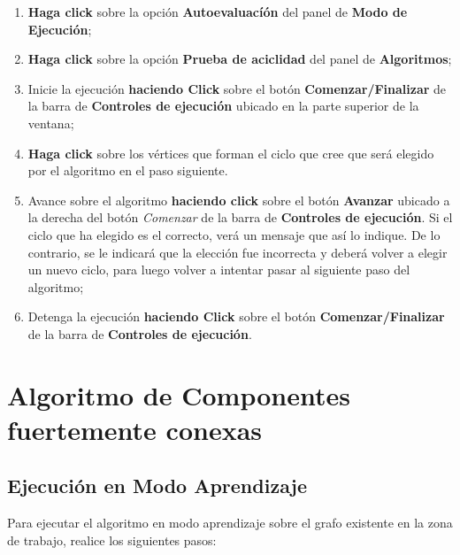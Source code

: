 \documentclass{book}
\begin{document}
\begin{enumerate}
	\itemsep=8pt \topsep=0pt \partopsep=0pt \parskip=0pt \parsep=0pt

	\item \textbf{Haga click} sobre la opción \textbf{Autoevaluacíón} del panel de \textbf{Modo de Ejecución};

	\item \textbf{Haga click} sobre la opción \textbf{Prueba de aciclidad} del panel de \textbf{Algoritmos};

	\item Inicie la ejecución \textbf{haciendo Click} sobre el botón \textbf{Comenzar/Finalizar} de la barra de \textbf{Controles de ejecución} ubicado en la parte superior de la ventana;

	\item \textbf{Haga click} sobre los vértices que forman el ciclo que cree que será elegido por el algoritmo en el paso siguiente.

	\item Avance sobre el algoritmo \textbf{haciendo click} sobre el botón \textbf{Avanzar} ubicado a la derecha del botón \textit{Comenzar} de la barra de \textbf{Controles de ejecución}. Si el ciclo que ha elegido es el correcto, verá un mensaje que así lo indique. De lo contrario, se le indicará que la elección fue incorrecta y deberá volver a elegir un nuevo ciclo, para luego volver a intentar pasar al siguiente paso del algoritmo;

	\item Detenga la ejecución \textbf{haciendo Click} sobre el botón \textbf{Comenzar/Finalizar} de la barra de \textbf{Controles de ejecución}.

\end{enumerate}
\medskip




%
%
\chapter{Algoritmo de Componentes fuertemente conexas}


\section{Ejecución en Modo Aprendizaje}

Para ejecutar el algoritmo en modo aprendizaje sobre el grafo existente en la zona de trabajo, realice los siguientes pasos:
\medskip
\end{document}

